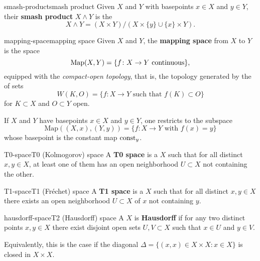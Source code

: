 \begin{topic}{smash-product}{smash product}
    Given  $X$ and $Y$ with basepoints $x \in X$ and $y \in Y$, their \textbf{smash product} $X \wedge Y$ is the 
    \[ X \wedge Y = (X \times Y) / (X \times \{ y \} \cup \{ x \} \times Y) . \]
\end{topic}

\begin{topic}{mapping-space}{mapping space}
    Given  $X$ and $Y$, the \textbf{mapping space} from $X$ to $Y$ is the space
    \[ \textup{Map}(X, Y) = \{ f \colon X \to Y \text{ continuous} \} , \]
    equipped with the \textit{compact-open topology}, that is, the topology generated by the  of sets
    \[ W(K, O) = \{ f \colon X \to Y \text{ such that } f(K) \subset O \} \]
    for $K \subset X$  and $O \subset Y$ open.
    
    If $X$ and $Y$ have basepoints $x \in X$ and $y \in Y$, one restricts to the subspace
    \[ \text{Map}((X, x), (Y, y)) = \{ f \colon X \to Y \text{ with } f(x) = y \} \]
    whose basepoint is the constant map $\textup{const}_y$.
\end{topic}

\begin{topic}{T0-space}{T0 (Kolmogorov) space}
    A \textbf{T0 space} is a  $X$ such that for all distinct $x, y \in X$, at least one of them has an open neighborhood $U \subset X$ not containing the other.
\end{topic}

\begin{topic}{T1-space}{T1 (Fréchet) space}
    A \textbf{T1 space} is a  $X$ such that for all distinct $x, y \in X$ there exists an open neighborhood $U \subset X$ of $x$ not containing $y$.
\end{topic}

\begin{topic}{hausdorff-space}{T2 (Hausdorff) space}
    A  $X$ is \textbf{Hausdorff} if for any two distinct points $x, y \in X$ there exist disjoint open sets $U, V \subset X$ such that $x \in U$ and $y \in V$.
    
    Equivalently, this is the case if the diagonal $\Delta = \{ (x, x) \in X \times X : x \in X \}$ is closed in $X \times X$.
\end{topic}

